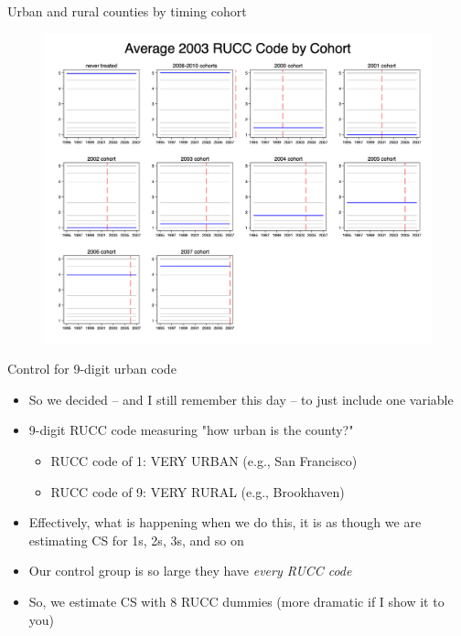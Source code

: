 \documentclass{beamer}
\begin{document}
\begin{frame}{Urban and rural counties by timing cohort}

\begin{figure}
    \centering
    \includegraphics[height=0.85\textheight]{./lecture_includes/pretty_RUCC}
\end{figure}

\end{frame}



\begin{frame}{Control for 9-digit urban code}

\begin{itemize}

\item So we decided -- and I still remember this day -- to just include one variable
\item 9-digit RUCC code measuring "how urban is the county?"
	\begin{itemize}
	\item RUCC code of 1: VERY URBAN (e.g., San Francisco)
	\item RUCC code of 9: VERY RURAL (e.g., Brookhaven)
	\end{itemize}
\item Effectively, what is happening when we do this, it is as though we are estimating CS for 1s, 2s, 3s, and so on
\item Our control group is so large they have \emph{every RUCC code}
\item So, we estimate CS with 8 RUCC dummies (more dramatic if I show it to you)
\end{itemize}

\end{frame}
\end{document}
